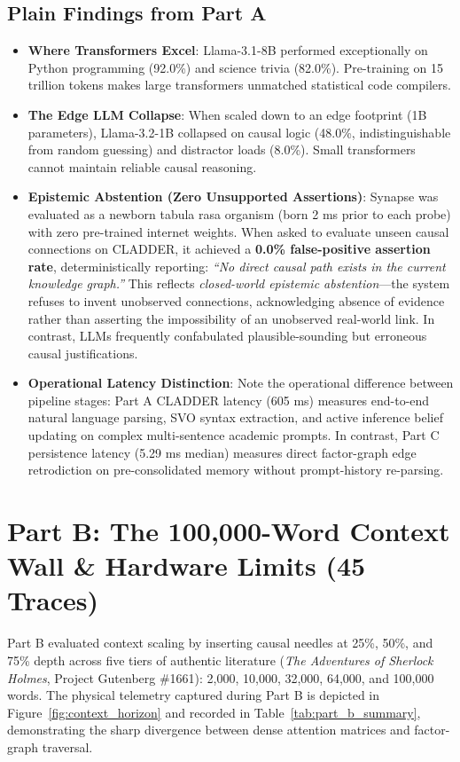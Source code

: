 \documentclass[11pt,a4paper]{article}
\begin{document}
\subsection{Plain Findings from Part A}
\begin{itemize}[leftmargin=1.5em, itemsep=1pt, topsep=1pt]
  \item \textbf{Where Transformers Excel}: Llama-3.1-8B performed exceptionally on Python programming (92.0\%) and science trivia (82.0\%). Pre-training on 15 trillion tokens makes large transformers unmatched statistical code compilers.
  \item \textbf{The Edge LLM Collapse}: When scaled down to an edge footprint (1B parameters), Llama-3.2-1B collapsed on causal logic (48.0\%, indistinguishable from random guessing) and distractor loads (8.0\%). Small transformers cannot maintain reliable causal reasoning.
  \item \textbf{Epistemic Abstention (Zero Unsupported Assertions)}: Synapse was evaluated as a newborn tabula rasa organism (born 2 ms prior to each probe) with zero pre-trained internet weights. When asked to evaluate unseen causal connections on CLADDER, it achieved a \textbf{0.0\% false-positive assertion rate}, deterministically reporting: \textit{``No direct causal path exists in the current knowledge graph.''} This reflects \textit{closed-world epistemic abstention}---the system refuses to invent unobserved connections, acknowledging absence of evidence rather than asserting the impossibility of an unobserved real-world link. In contrast, LLMs frequently confabulated plausible-sounding but erroneous causal justifications.
  \item \textbf{Operational Latency Distinction}: Note the operational difference between pipeline stages: Part A CLADDER latency (605 ms) measures end-to-end natural language parsing, SVO syntax extraction, and active inference belief updating on complex multi-sentence academic prompts. In contrast, Part C persistence latency (5.29 ms median) measures direct factor-graph edge retrodiction on pre-consolidated memory without prompt-history re-parsing.
\end{itemize}

\section{Part B: The 100,000-Word Context Wall \& Hardware Limits (45 Traces)}
Part B evaluated context scaling by inserting causal needles at 25\%, 50\%, and 75\% depth across five tiers of authentic literature (\textit{The Adventures of Sherlock Holmes}, Project Gutenberg \#1661): 2,000, 10,000, 32,000, 64,000, and 100,000 words. The physical telemetry captured during Part B is depicted in Figure~\ref{fig:context_horizon} and recorded in Table~\ref{tab:part_b_summary}, demonstrating the sharp divergence between dense attention matrices and factor-graph traversal.
\end{document}
